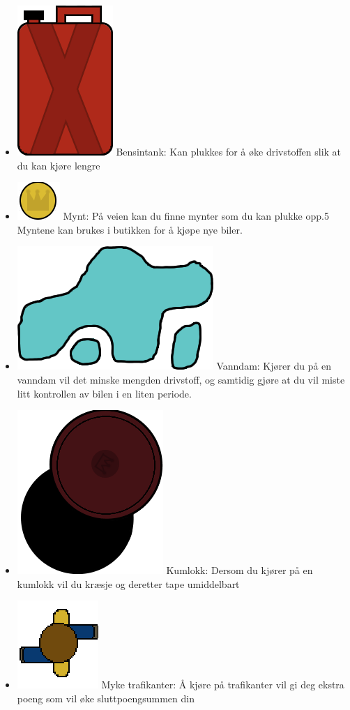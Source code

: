 \documentclass[paper=a4]{article}
\begin{document}
\begin{itemize}
	\item \includegraphics[scale=0.2]{images/gastank.png} Bensintank: Kan plukkes for å øke drivstoffen slik at du kan kjøre lengre 
	\item \includegraphics[scale=0.5]{images/coin.png} Mynt: På veien kan du finne mynter som du kan plukke opp.5
																Myntene kan brukes i butikken for å kjøpe nye biler.
	\item \includegraphics[scale=0.2]{images/puddle.png} Vanndam: Kjører du på en vanndam vil det minske mengden drivstoff,
																og samtidig gjøre at du vil miste litt kontrollen av bilen i en liten periode. 
	\item \includegraphics[scale=0.2]{images/manhole.png} Kumlokk: Dersom du kjører på en kumlokk vil du kræsje og deretter tape umiddelbart
	\item \includegraphics[scale=0.4]{images/walker.png} Myke trafikanter: Å kjøre på trafikanter vil gi deg ekstra poeng som vil øke sluttpoengsummen din 
\end{itemize}
\end{document}
